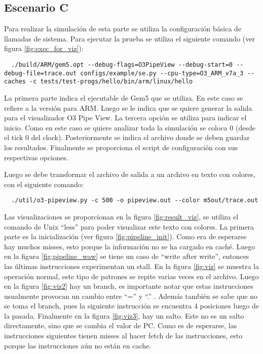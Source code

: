 \documentclass {article}
\begin{document}
\subsection{Escenario C}

Para realizar la simulación de esta parte se utiliza la configuración básica de llamadas de
sistema. Para ejecutar la prueba se utiliza el siguiente comando (ver figura \ref{fig:exec_for_viz}):

\begin{lstlisting}
  ./build/ARM/gem5.opt --debug-flags=O3PipeView --debug-start=0 --debug-file=trace.out configs/example/se.py --cpu-type=O3_ARM_v7a_3 --caches -c tests/test-progs/hello/bin/arm/linux/hello
\end{lstlisting}

La primera parte indica el ejecutable de Gem5 que se utiliza. En este caso se refiere a la versión
para ARM. Luego se le indica que se quiere generar la salida para el visualizador O3 Pipe View. La
tercera opción se utiliza para indicar el inicio. Como en este caso se quiere analizar toda la
simulación se coloca 0 (desde el tick 0 del clock). Posteriormente se indica el archivo donde se
deben guardar los resultados. Finalmente se proporciona el script de configuración con sus
respectivas opciones.

Luego se debe transformar el archivo de salida a un archivo en texto con
colores, con el siguiente comando:

\begin{lstlisting}
  ./util/o3-pipeview.py -c 500 -o pipeview.out --color m5out/trace.out
\end{lstlisting}

Las visualizaciones se proporcionan en la figura \ref{fig:result_viz}, se utiliza el comando de Unix
``less'' para poder visualizar este texto con colores. La primera parte es la
inicialización (ver figura \ref{fig:pipeline_init}). Como era de esperarse hay muchos misses, esto
porque la información no se ha cargado en caché. Luego en la figura \ref{fig:pipeline_waw} se tiene
un caso de ``write after write'', entonces las últimas instrucciones experimentan un stall. En la
figura \ref{fig:viz} se muestra la operación normal, este tipo de patrones se repite varias veces
en el archivo. Luego en la figura \ref{fig:viz2} hay un branch, es importante notar que estas
instrucciones usualmente provocan un cambio entre ``='' y ``.'' . Además también se sabe que no se
toma el branch, pues la siguiente instrucción se encuentra 4 posiciones luego de la
pasada. Finalmente en la figura \ref{fig:viz3}, hay un salto. Este no es un salto directamente, sino
que se cambia el valor de PC. Como es de esperarse, las instrucciones siguientes tienen misses al
hacer fetch de las instrucciones, esto porque las instrucciones aún no están en cache.
\end{document}
